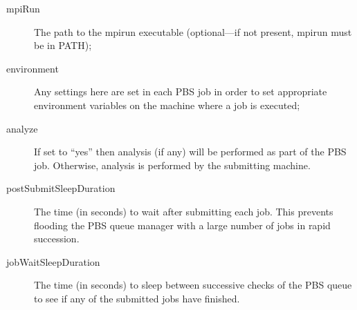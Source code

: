 \begin{description}
\begin{description}
\item[{\normalfont \ttfamily mpiRun}] The path to the {\normalfont \ttfamily mpirun} executable (optional---if not present, {\normalfont \ttfamily mpirun} must be in {\normalfont \ttfamily PATH});
\item[{\normalfont \ttfamily environment}] Any settings here are set in each {\normalfont \scshape PBS} job in order to set appropriate environment variables on the machine where a job is executed;
\item[{\normalfont \ttfamily analyze}] If set to ``{\normalfont \ttfamily yes}'' then analysis (if any) will be performed as part of the PBS job. Otherwise, analysis is performed by the submitting machine.
\item[{\normalfont \ttfamily postSubmitSleepDuration}] The time (in seconds) to wait after submitting each job. This prevents flooding the PBS queue manager with a large number of jobs in rapid succession.
\item[{\normalfont \ttfamily jobWaitSleepDuration}] The time (in seconds) to sleep between successive checks of the PBS queue to see if any of the submitted jobs have finished.
\end{description}


\end{description}
